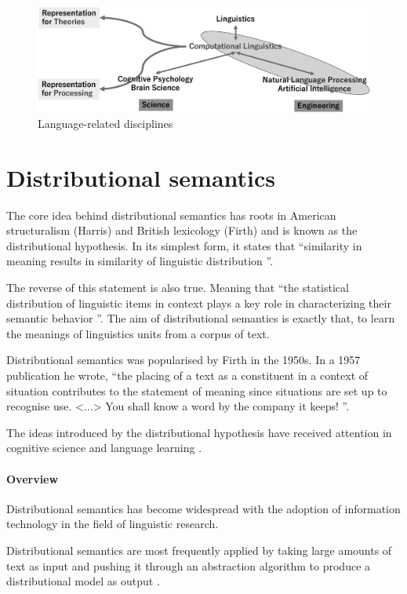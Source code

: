 \documentclass[14pt, a4paper]{extreport}
\begin{document}
\begin{figure}[ht]
\bigskip
\includegraphics[width=14cm]{nlpcl}
\centering
\caption{Language-related disciplines \parencite{nlpandcl}}
\end{figure}
  \section{Distributional semantics}

The core idea behind distributional semantics has roots in American structuralism (Harris) and British lexicology (Firth) and is known as the distributional hypothesis. In its simplest form, it states that ``similarity in meaning results in similarity of linguistic distribution \parencite{harris}''.

The reverse of this statement is also true. Meaning that ``the statistical distribution of linguistic items in context plays a key role in characterizing their semantic behavior \parencite{lenci}''. The aim of distributional semantics is exactly that, to learn the meanings of linguistics units from a corpus of text.

Distributional semantics was popularised by Firth in the 1950s. In a 1957 publication he wrote, ``the placing of a text as a constituent in a context of situation contributes to the statement of meaning since situations are set up to recognise use. <...> You shall know a word by the company it keeps! \parencite[11]{firth}''.

The ideas introduced by the distributional hypothesis have received attention in cognitive science \parencite{mcdonald} and language learning \parencite{yarlett}.%
      \paragraph{Overview}
Distributional semantics has become widespread with the adoption of information technology in the field of linguistic research.

Distributional semantics are most frequently applied by taking large amounts of text as input and pushing it through an abstraction algorithm to produce a distributional model as output \parencite{emerson}.
\end{document}
